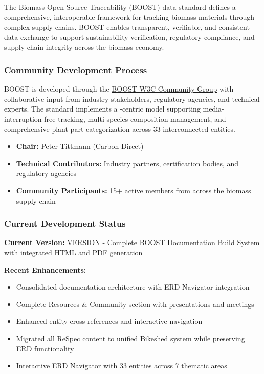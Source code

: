 
The Biomass Open-Source Traceability (BOOST) data standard defines a comprehensive, interoperable framework for tracking biomass materials through complex supply chains. BOOST enables transparent, verifiable, and consistent data exchange to support sustainability verification, regulatory compliance, and supply chain integrity across the biomass economy.

\subsubsection{Community Development Process}
\label{sec:community-development-process}

BOOST is developed through the \href{https://www.w3.org/community/boost-01/}{BOOST W3C Community Group} with collaborative input from industry stakeholders, regulatory agencies, and technical experts. The standard implements a \TRU-centric model supporting media-interruption-free tracking, multi-species composition management, and comprehensive plant part categorization across 33 interconnected entities.

\begin{informative}[title=Working Group Leadership]
\begin{itemize}
    \item \textbf{Chair:} Peter Tittmann (Carbon Direct)
    \item \textbf{Technical Contributors:} Industry partners, certification bodies, and regulatory agencies  
    \item \textbf{Community Participants:} 15+ active members from across the biomass supply chain
\end{itemize}
\end{informative}

\subsubsection{Current Development Status}
\label{sec:development-status}

\begin{important}[title=Current Version Information]
\textbf{Current Version:} {{VERSION}} - Complete BOOST Documentation Build System with integrated HTML and PDF generation

\textbf{Recent Enhancements:}
\begin{itemize}
    \item Consolidated documentation architecture with ERD Navigator integration
    \item Complete Resources \& Community section with presentations and meetings
    \item Enhanced entity cross-references and interactive navigation  
    \item Migrated all ReSpec content to unified Bikeshed system while preserving ERD functionality
    \item Interactive ERD Navigator with 33 entities across 7 thematic areas
\end{itemize}
\end{important}

